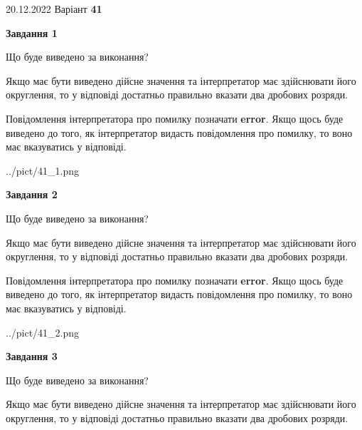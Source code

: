 \documentclass[12pt, ukrainian]{article}
\begin{document}
{20.12.2022 Варіант \No \textbf { 41 }\par}
{
\begin {Large}

{\begin {center}\textbf{Завдання 1}\end {center}}\par
Що буде виведено за виконання? \par

Якщо має бути виведено дійсне значення та інтерпретатор має здійснювати його округлення, 
то у відповіді достатньо правильно вказати два дробових розряди.

Повідомлення інтерпретатора про помилку позначати \textbf{error}.
Якщо щось буде виведено до того, як інтерпретатор видасть повідомлення про помилку, 
то воно має вказуватись у відповіді. \par

\begin{center}
	{../pict/41_1.png}
\end{center}
\newpage

{\begin {center}\textbf{Завдання 2}\end {center}}\par
Що буде виведено за виконання? \par

Якщо має бути виведено дійсне значення та інтерпретатор має здійснювати його округлення, 
то у відповіді достатньо правильно вказати два дробових розряди.

Повідомлення інтерпретатора про помилку позначати \textbf{error}.
Якщо щось буде виведено до того, як інтерпретатор видасть повідомлення про помилку, 
то воно має вказуватись у відповіді. \par

\begin{center}
	{../pict/41_2.png}
\end{center}
\newpage

{\begin {center}\textbf{Завдання 3}\end {center}}\par
Що буде виведено за виконання? \par

Якщо має бути виведено дійсне значення та інтерпретатор має здійснювати його округлення, 
то у відповіді достатньо правильно вказати два дробових розряди.


\end{Large}}
\end{document}
